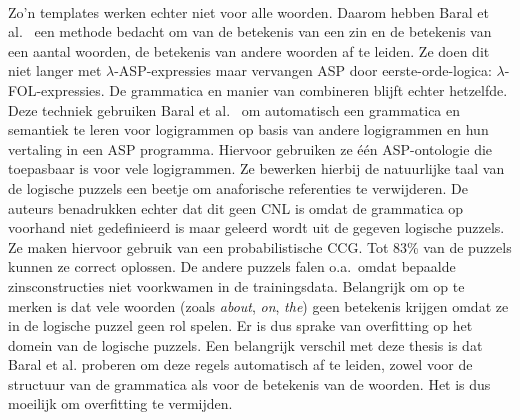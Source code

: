 \paragraph{}Zo'n templates werken echter niet voor alle woorden. Daarom hebben Baral et al.\ \cite{Baral2012} een methode bedacht om van de betekenis van een zin en de betekenis van een aantal woorden, de betekenis van andere woorden af te leiden. Ze doen dit niet langer met $\lambda$-ASP-expressies maar vervangen ASP door eerste-orde-logica: $\lambda$-FOL-expressies. De grammatica en manier van combineren blijft echter hetzelfde. Deze techniek gebruiken Baral et al.\ \cite{Baral2012a} om automatisch een grammatica en semantiek te leren voor logigrammen op basis van andere logigrammen en hun vertaling in een ASP programma. Hiervoor gebruiken ze \'e\'en ASP-ontologie die toepasbaar is voor vele logigrammen. Ze bewerken hierbij de natuurlijke taal van de logische puzzels een beetje om anaforische referenties te verwijderen. De auteurs benadrukken echter dat dit geen CNL is omdat de grammatica op voorhand niet gedefinieerd is maar geleerd wordt uit de gegeven logische puzzels. Ze maken hiervoor gebruik van een probabilistische CCG. Tot 83\% van de puzzels kunnen ze correct oplossen. De andere puzzels falen o.a.\ omdat bepaalde zinsconstructies niet voorkwamen in de trainingsdata. Belangrijk om op te merken is dat vele woorden (zoals \textit{about}, \textit{on}, \textit{the}) geen betekenis krijgen omdat ze in de logische puzzel geen rol spelen. Er is dus sprake van overfitting op het domein van de logische puzzels. Een belangrijk verschil met deze thesis is dat Baral et al. proberen om deze regels automatisch af te leiden, zowel voor de structuur van de grammatica als voor de betekenis van de woorden. Het is dus moeilijk om overfitting te vermijden.

